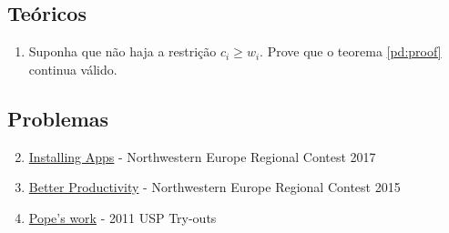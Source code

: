 \subsection*{Teóricos}

\begin{enumerate}
  \item Suponha que não haja a restrição $c_i \geq w_i$. Prove que o teorema \ref{pd:proof} continua válido.
\end{enumerate}

\subsection*{Problemas}

\begin{enumerate}
  \setcounter{enumi}{1}
  \item \href{https://open.kattis.com/problems/installingapps}{Installing Apps} - Northwestern Europe Regional Contest 2017
  \item \href{https://icpcarchive.ecs.baylor.edu/index.php?option=com_onlinejudge&Itemid=8&page=show_problem&problem=5446}{Better Productivity} - Northwestern Europe Regional Contest 2015
  \item \href{https://codeforces.com/gym/101081/problem/K}{Pope's work} - 2011 USP Try-outs
\end{enumerate}
